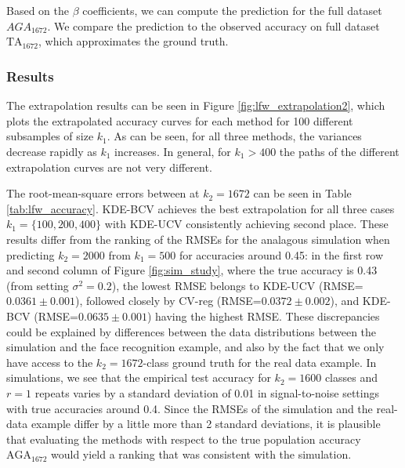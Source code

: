 \documentclass[twoside,11pt]{article}
\begin{document}
Based on the $\beta$ coefficients, we can compute the prediction for
the full dataset $\hat{AGA}_{1672}$.  We compare the prediction to the
observed accuracy on full dataset $\text{TA}_{1672}$, which
approximates the ground truth.

\subsubsection*{Results}

The extrapolation results can be seen in Figure
\ref{fig:lfw_extrapolation2}, which plots the extrapolated accuracy
curves for each method for 100 different subsamples of size $k_1$.  As
can be seen, for all three methods, the variances decrease rapidly as
$k_1$ increases. In general, for $k_1>400$ the paths of the different
extrapolation curves are not very different. 

The root-mean-square errors between at $k_2=1672$ can be seen in Table
\ref{tab:lfw_accuracy}.  KDE-BCV achieves the best extrapolation for
all three cases $k_1= \{100,200,400\}$ with KDE-UCV consistently
achieving second place.  These results differ from the ranking of the
RMSEs for the analagous simulation when predicting $k_2 = 2000$ from
$k_1 = 500$ for accuracies around 0.45: in the first row and second
column of Figure \ref{fig:sim_study}, where the true accuracy is 0.43
(from setting $\sigma^2=0.2$), the lowest RMSE belongs to KDE-UCV
(RMSE=$0.0361 \pm 0.001$), followed closely by CV-reg (RMSE=$0.0372
\pm 0.002$), and KDE-BCV (RMSE=$0.0635\pm0.001$) having the highest
RMSE.  These discrepancies could be explained by differences between
the data distributions between the simulation and the face recognition
example, and also by the fact that we only have access to the $k_2 =
1672$-class ground truth for the real data example.  In simulations,
we see that the empirical test accuracy for $k_2 = 1600$ classes and
$r=1$ repeats varies by a standard deviation of 0.01 in
signal-to-noise settings with true accuracies around 0.4.  Since the
RMSEs of the simulation and the real-data example differ by a little
more than 2 standard deviations, it is plausible that evaluating the
methods with respect to the true population accuracy
$\text{AGA}_{1672}$ would yield a ranking that was consistent with the
simulation.
\end{document}
